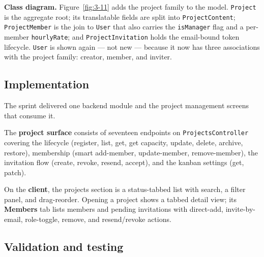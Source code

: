 
\textbf{Class diagram.} Figure~\ref{fig:3-11} adds the project family to the model. \texttt{Project}
is the aggregate root; its translatable fields are split into \texttt{ProjectContent};
\texttt{ProjectMember} is the join to \texttt{User} that also carries the \texttt{isManager} flag and a
per-member \texttt{hourlyRate}; and \texttt{ProjectInvitation} holds the email-bound token lifecycle.
\texttt{User} is shown again --- not new --- because it now has three associations with the
project family: creator, member, and inviter.

{\renewcommand{\figmaxheight}{0.62\textheight}%
}

\subsection{Implementation}

The sprint delivered one backend module and the project management screens that consume it.

The \textbf{project surface} consists of seventeen endpoints on \texttt{ProjectsController} covering
the lifecycle (register, list, get, get capacity, update, delete, archive, restore), membership
(smart add-member, update-member, remove-member), the invitation flow (create, revoke, resend,
accept), and the kanban settings (get, patch).

On the \textbf{client}, the projects section is a status-tabbed list with search, a filter panel,
and drag-reorder. Opening a project shows a tabbed detail view; its \textbf{Members} tab lists
members and pending invitations with direct-add, invite-by-email, role-toggle, remove, and
resend/revoke actions.





\subsection{Validation and testing}

